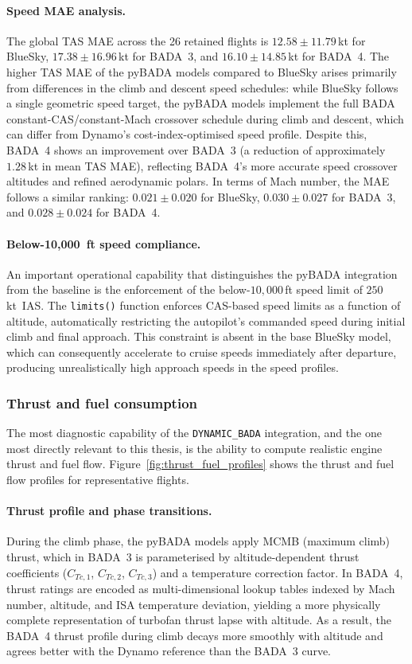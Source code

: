 \paragraph{Speed MAE analysis.}
The global TAS MAE across the 26 retained flights is $12.58 \pm 11.79$\,kt for BlueSky, $17.38 \pm 16.96$\,kt for BADA~3, and $16.10 \pm 14.85$\,kt for BADA~4. The higher TAS MAE of the pyBADA models compared to BlueSky arises primarily from differences in the climb and descent speed schedules: while BlueSky follows a single geometric speed target, the pyBADA models implement the full BADA constant-CAS/constant-Mach crossover schedule during climb and descent, which can differ from Dynamo's cost-index-optimised speed profile. Despite this, BADA~4 shows an improvement over BADA~3 (a reduction of approximately $1.28$\,kt in mean TAS MAE), reflecting BADA~4's more accurate speed crossover altitudes and refined aerodynamic polars. In terms of Mach number, the MAE follows a similar ranking: $0.021 \pm 0.020$ for BlueSky, $0.030 \pm 0.027$ for BADA~3, and $0.028 \pm 0.024$ for BADA~4.

\paragraph{Below-10,000~ft speed compliance.}
An important operational capability that distinguishes the pyBADA integration from the baseline is the enforcement of the below-$10{,}000$\,ft speed limit of $250$\,kt~IAS. The \texttt{limits()} function enforces CAS-based speed limits as a function of altitude, automatically restricting the autopilot's commanded speed during initial climb and final approach. This constraint is absent in the base BlueSky model, which can consequently accelerate to cruise speeds immediately after departure, producing unrealistically high approach speeds in the speed profiles.

\subsubsection{Thrust and fuel consumption}

The most diagnostic capability of the \texttt{DYNAMIC\_BADA} integration, and the one most directly relevant to this thesis, is the ability to compute realistic engine thrust and fuel flow. Figure~\ref{fig:thrust_fuel_profiles} shows the thrust and fuel flow profiles for representative flights.

\paragraph{Thrust profile and phase transitions.}
During the climb phase, the pyBADA models apply MCMB (maximum climb) thrust, which in BADA~3 is parameterised by altitude-dependent thrust coefficients ($C_{Tc,1}$, $C_{Tc,2}$, $C_{Tc,3}$) and a temperature correction factor. In BADA~4, thrust ratings are encoded as multi-dimensional lookup tables indexed by Mach number, altitude, and ISA temperature deviation, yielding a more physically complete representation of turbofan thrust lapse with altitude. As a result, the BADA~4 thrust profile during climb decays more smoothly with altitude and agrees better with the Dynamo reference than the BADA~3 curve.


